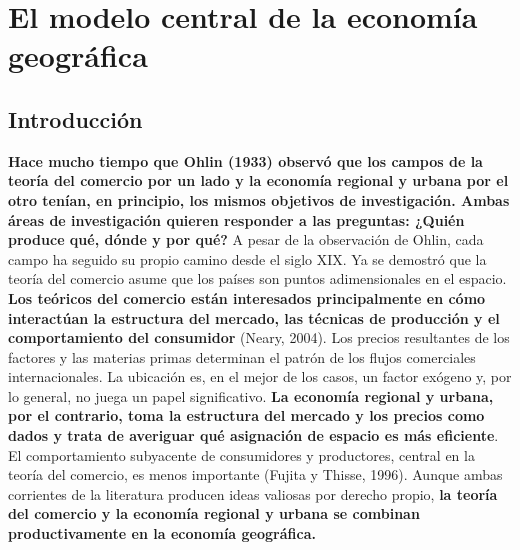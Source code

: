 \chapter{El modelo central de la economía geográfica}
\section{Introducción}
\textbf{Hace mucho tiempo que Ohlin (1933) observó que los campos de la teoría del comercio por un lado y la economía regional y urbana por el otro tenían, en principio, los mismos objetivos de investigación. Ambas áreas de investigación quieren responder a las preguntas: ¿Quién produce qué, dónde y por qué?} A pesar de la observación de Ohlin, cada campo ha seguido su propio camino desde el siglo XIX. Ya se demostró que la teoría del comercio asume que los países son puntos adimensionales en el espacio. \textbf{Los teóricos del comercio están interesados principalmente en cómo interactúan la estructura del mercado, las técnicas de producción y el comportamiento del consumidor} (Neary, 2004). Los precios resultantes de los factores y las materias primas determinan el patrón de los flujos comerciales internacionales. La ubicación es, en el mejor de los casos, un factor exógeno y, por lo general, no juega un papel significativo. \textbf{La economía regional y urbana, por el contrario, toma la estructura del mercado y los precios como dados y trata de averiguar qué asignación de espacio es más eficiente}. El comportamiento subyacente de consumidores y productores, central en la teoría del comercio, es menos importante (Fujita y Thisse, 1996). Aunque ambas corrientes de la literatura producen ideas valiosas por derecho propio, \textbf{la teoría del comercio y la economía regional y urbana se combinan productivamente en la economía geográfica.}\\   


